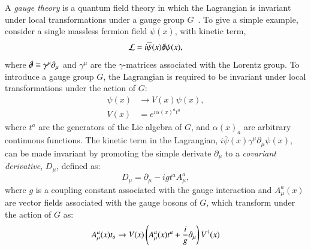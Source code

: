 
A \emph{gauge theory} is a quantum field theory in which the Lagrangian is invariant under local transformations under a gauge group $G$~\cite{peskinschroeder}. To give a simple example, consider a single massless fermion field $\psi(x)$, with kinetic term,
\begin{equation}
	\mathcal{L} = i\overline{\psi}(x) \slashed{\partial} \psi(x),
\end{equation}
where $\slashed{\partial}\equiv \gamma^{\mu}\partial_{\mu}$ and $\gamma^{\mu}$ are the $\gamma$-matrices associated with the Lorentz group. To introduce a gauge group $G$, the Lagrangian is required to be invariant under local transformations under the action of $G$:
 \begin{align*}
 	\psi(x) &\rightarrow V(x) \psi(x), \\
 	V(x) &= e^{i\alpha(x)^a t^a}
 \end{align*}
 where $t^a$ are the generators of the Lie algebra of $G$, and $\alpha(x)_a$ are arbitrary continuous functions. The kinetic term in the Lagrangian, $i\overline{\psi}(x)\gamma^{\mu}\partial_{\mu}\psi(x)$, can be made invariant by promoting the simple derivate $\partial_{\mu}$ to a \emph{covariant derivative}, $D_{\mu}$, defined as:
\begin{equation}\label{eqn:covariant-derivative-qcd}
	D_{\mu} = \partial_{\mu} - i g t^a A^a_{\mu},
\end{equation}
where $g$ is a coupling constant associated with the gauge interaction and $A^a_{\mu}(x)$ are vector fields associated with the gauge bosons of $G$, which transform under the action of $G$ as:
\begin{equation}\label{eqn:gauge-field-transformation}
	A^a_{\mu}(x)t_a \rightarrow V(x) \left(A^a_{\mu}(x)t^a + \frac{i}{g} \partial_{\mu}\right) V^{\dagger}(x) \\
\end{equation}
